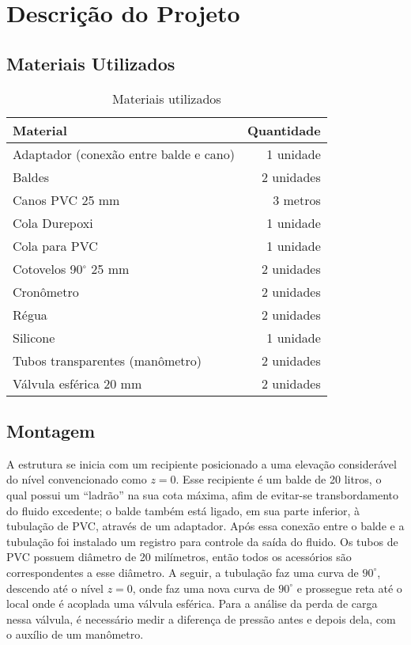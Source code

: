\chapter{Descrição do Projeto}\label{descricao}

\section{Materiais Utilizados}

 \begin{table}[H]\label{t:custos}
     \centering
     \begin{tabular}{l r}
         \toprule
         \textbf{Material} & \textbf{Quantidade} \\
         \midrule
         Adaptador (conexão entre balde e cano) & 1 unidade \\
         Baldes & 2 unidades \\
         Canos PVC 25 mm &  3 metros \\
         Cola Durepoxi & 1 unidade \\
         Cola para PVC & 1 unidade \\
         Cotovelos 90$^\circ$ 25 mm & 2 unidades \\
         Cronômetro & 2 unidades \\
         Régua & 2 unidades \\
         Silicone & 1 unidade \\
         Tubos transparentes (manômetro) & 2 unidades \\
         Válvula esférica 20 mm & 2 unidades \\
         \bottomrule
     \end{tabular}
     \caption{Materiais utilizados}
 \end{table}

\section{Montagem}
\label{sec:montagem}

A estrutura se inicia com um recipiente posicionado a uma elevação considerável
do nível convencionado como $z = 0$. Esse recipiente é um balde de 20 litros, o
qual possui um ``ladrão'' na sua cota máxima, afim de evitar-se transbordamento
do fluido excedente; o balde também está ligado, em sua parte inferior, à
tubulação de PVC, através de um adaptador. Após essa conexão entre o balde e a
tubulação foi instalado um registro para controle da saída do fluido. Os tubos
de PVC possuem diâmetro de 20 milímetros, então todos os acessórios são
correspondentes a esse diâmetro. A seguir, a tubulação faz uma curva de
$90^\circ$, descendo até o nível $z = 0$, onde faz uma nova curva de $90^\circ$
e prossegue reta até o local onde é acoplada uma válvula esférica. Para a
análise da perda de carga nessa válvula, é necessário medir a diferença de
pressão antes e depois dela, com o auxílio de um manômetro.

